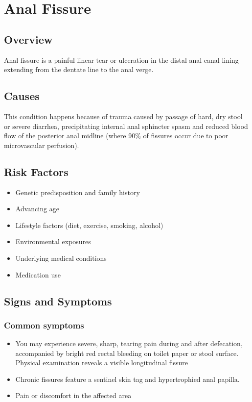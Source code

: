 \chapter{Anal Fissure}
\label{sec:Anal Fissure}

\section{Overview}
Anal fissure is a painful linear tear or ulceration in the distal anal canal lining extending from the dentate line to the anal verge.
\section{Causes}
This condition happens because of trauma caused by passage of hard, dry stool or severe diarrhea, precipitating internal anal sphincter spasm and reduced blood flow of the posterior anal midline (where 90\% of fissures occur due to poor microvascular perfusion).     
\section{Risk Factors}

\begin{itemize}[noitemsep]
  \item Genetic predisposition and family history
  \item Advancing age
  \item Lifestyle factors (diet, exercise, smoking, alcohol)
  \item Environmental exposures
  \item Underlying medical conditions
  \item Medication use
\end{itemize}
\section{Signs and Symptoms}

\subsection{Common symptoms}
\begin{itemize}[noitemsep]
  \item You may experience severe, sharp, tearing pain during and after defecation, accompanied by bright red rectal bleeding on toilet paper or stool surface. Physical examination reveals a visible longitudinal fissure
  \item Chronic fissures feature a sentinel skin tag and hypertrophied anal papilla.
  \item Pain or discomfort in the affected area
  \end{itemize}

